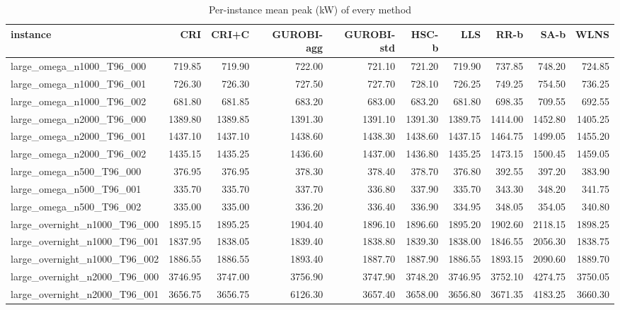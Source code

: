 \begin{table}[htbp]
\centering
\small
\caption{Per-instance mean peak (kW) of every method}
\label{tab:E4b_equal_budgets_60s_b60_per_instance}
\begin{tabular}{lrrrrrrrrr}
\toprule
instance & CRI & CRI+C & GUROBI-agg & GUROBI-std & HSC-b & LLS & RR-b & SA-b & WLNS \\
\midrule
large\_omega\_n1000\_T96\_000 & 719.85 & 719.90 & 722.00 & 721.10 & 721.20 & 719.90 & 737.85 & 748.20 & 724.85 \\
large\_omega\_n1000\_T96\_001 & 726.30 & 726.30 & 727.50 & 727.70 & 728.10 & 726.25 & 749.25 & 754.50 & 736.25 \\
large\_omega\_n1000\_T96\_002 & 681.80 & 681.85 & 683.20 & 683.00 & 683.20 & 681.80 & 698.35 & 709.55 & 692.55 \\
large\_omega\_n2000\_T96\_000 & 1389.80 & 1389.85 & 1391.30 & 1391.10 & 1391.30 & 1389.75 & 1414.00 & 1452.80 & 1405.25 \\
large\_omega\_n2000\_T96\_001 & 1437.10 & 1437.10 & 1438.60 & 1438.30 & 1438.60 & 1437.15 & 1464.75 & 1499.05 & 1455.20 \\
large\_omega\_n2000\_T96\_002 & 1435.15 & 1435.25 & 1436.60 & 1437.00 & 1436.80 & 1435.25 & 1473.15 & 1500.45 & 1459.05 \\
large\_omega\_n500\_T96\_000 & 376.95 & 376.95 & 378.30 & 378.40 & 378.70 & 376.80 & 392.55 & 397.20 & 383.90 \\
large\_omega\_n500\_T96\_001 & 335.70 & 335.70 & 337.70 & 336.80 & 337.90 & 335.70 & 343.30 & 348.20 & 341.75 \\
large\_omega\_n500\_T96\_002 & 335.00 & 335.00 & 336.20 & 336.40 & 336.90 & 334.95 & 348.05 & 354.05 & 340.80 \\
large\_overnight\_n1000\_T96\_000 & 1895.15 & 1895.25 & 1904.40 & 1896.10 & 1896.60 & 1895.20 & 1902.60 & 2118.15 & 1898.25 \\
large\_overnight\_n1000\_T96\_001 & 1837.95 & 1838.05 & 1839.40 & 1838.80 & 1839.30 & 1838.00 & 1846.55 & 2056.30 & 1838.75 \\
large\_overnight\_n1000\_T96\_002 & 1886.55 & 1886.55 & 1893.40 & 1887.70 & 1887.90 & 1886.55 & 1893.15 & 2090.60 & 1889.70 \\
large\_overnight\_n2000\_T96\_000 & 3746.95 & 3747.00 & 3756.90 & 3747.90 & 3748.20 & 3746.95 & 3752.10 & 4274.75 & 3750.05 \\
large\_overnight\_n2000\_T96\_001 & 3656.75 & 3656.75 & 6126.30 & 3657.40 & 3658.00 & 3656.80 & 3671.35 & 4183.25 & 3660.30 \\

\end{tabular}
\end{table}
